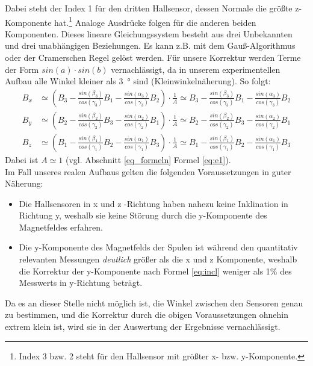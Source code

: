\documentclass[12pt,a4paper]{article}
\begin{document}
Dabei steht der Index 1 für den dritten Hallsensor, dessen Normale die größte z-Komponente hat.\footnote{Index 3 bzw. 2 steht für den Hallsensor mit größter x- bzw. y-Komponente.} Analoge Ausdrücke folgen für die anderen beiden Komponenten. Dieses lineare Gleichungssystem besteht aus drei Unbekannten und drei unabhängigen Beziehungen. Es kann z.B. mit dem Gauß-Algorithmus oder der Cramerschen Regel gelöst werden. Für unsere Korrektur werden Terme der Form $sin(a)\cdot sin(b)$ vernachlässigt, da in unserem experimentellen Aufbau alle Winkel kleiner als \SI{3}{\degree} sind (Kleinwinkelnäherung). So folgt:
\begin{align}
\label{eq:incl}
\nonumber B_x &\simeq \left( B_3 - \frac{sin(\beta_3)}{cos(\gamma_3)}B_1 - \frac{sin(\alpha_3)}{cos(\gamma_3)}B_2 \right) \cdot \frac{1}{A} \simeq  B_3 - \frac{sin(\beta_3)}{cos(\gamma_3)}B_1 - \frac{sin(\alpha_3)}{cos(\gamma_3)}B_2\\
B_y &\simeq \left( B_2 - \frac{sin(\beta_2)}{cos(\gamma_2)}B_3 - \frac{sin(\alpha_2)}{cos(\gamma_2)}B_1 \right) \cdot \frac{1}{A}\simeq  B_2 - \frac{sin(\beta_2)}{cos(\gamma_2)}B_3  - \frac{sin(\alpha_2)}{cos(\gamma_2)}B_1\\
\nonumber B_z &\simeq \left( B_1 - \frac{sin(\beta_1)}{cos(\gamma_1)}B_2 - \frac{sin(\alpha_1)}{cos(\gamma_1)}B_3 \right) \cdot \frac{1}{A}\simeq  B_1 - \frac{sin(\beta_1)}{cos(\gamma_1)}B_2 - \frac{sin(\alpha_1)}{cos(\gamma_1)}B_3
\end{align}
Dabei ist $A\simeq 1$ (vgl. Abschnitt \ref{eq_formeln} Formel \ref{eq:e1}).\\

\noindent Im Fall unseres realen Aufbaus gelten die folgenden Voraussetzungen in guter Näherung:
\begin{itemize}
	\item Die Hallsensoren in x und z -Richtung haben nahezu keine Inklination in Richtung y, weshalb sie keine Störung durch die y-Komponente des Magnetfeldes erfahren.
	\item Die y-Komponente des Magnetfelds der Spulen ist während den quantitativ relevanten Messungen \textit{deutlich} größer als die x und z Komponente, weshalb die Korrektur der y-Komponente nach Formel \ref{eq:incl} weniger als 1\% des Messwerts in y-Richtung beträgt.
\end{itemize}
Da es an dieser Stelle nicht möglich ist, die Winkel zwischen den Sensoren genau zu bestimmen, und die Korrektur durch die obigen Voraussetzungen ohnehin extrem klein ist, wird sie in der Auswertung der Ergebnisse vernachlässigt.
\end{document}
